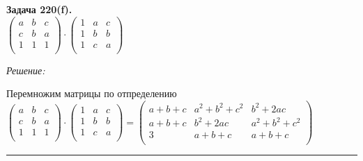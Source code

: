 \documentclass[a4paper, 12pt]{article}
\newenvironment{problem}[2][Задача]
    { \begin{mdframed}[backgroundcolor=gray!10] \textbf{#1 #2.} \\}
    {  \end{mdframed}}
\newenvironment{solution}
    {\textit{Решение: }}
    {\noindent\rule{7in}{1.5pt}}
\begin{document}
\begin{problem}{220(f)}
$\left(
\begin{array}{rrr}
a & b & c \\
c & b & a \\
1 & 1 & 1 \\
\end{array}
\right)
\cdot
\left(
\begin{array}{rrr}
1 & a & c \\
1 & b & b \\
1 & c & a \\
\end{array}
\right)
$

\end{problem}
\begin{solution}

Перемножим матрицы по отпределению \\
$\left(
\begin{array}{rrr}
a & b & c \\
c & b & a \\
1 & 1 & 1 \\
\end{array}
\right)
\cdot
\left(
\begin{array}{rrr}
1 & a & c \\
1 & b & b \\
1 & c & a \\
\end{array}
\right)
=
\left(
\begin{array}{rrr}
a + b + c & a^2 + b^2 + c^2 & b^2 + 2ac \\
a + b + c  & b^2 + 2ac & a^2 + b^2 + c^2 \\
3 & a + b + c & a + b + c \\
\end{array}
\right)

$

\end{solution} 
\end{document}
